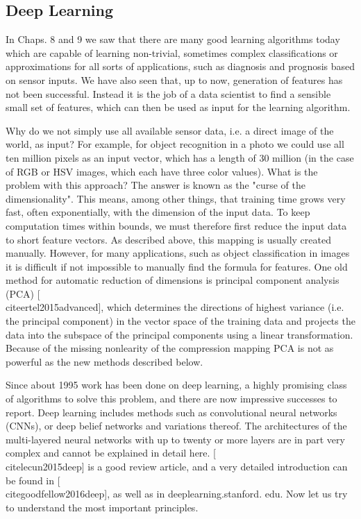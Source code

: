 \documentclass[10pt]{book}
\begin{document}
\subsection*{Deep Learning}
In Chaps. 8 and 9 we saw that there are many good learning algorithms today which are capable of learning non-trivial, sometimes complex classifications or approximations for all sorts of applications, such as diagnosis and prognosis based on sensor inputs. We have also seen that, up to now, generation of features has not been successful. Instead it is the job of a data scientist to find a sensible small set of features, which can then be used as input for the learning algorithm.

Why do we not simply use all available sensor data, i.e. a direct image of the world, as input? For example, for object recognition in a photo we could use all ten million pixels as an input vector, which has a length of 30 million (in the case of RGB or HSV images, which each have three color values). What is the problem with this approach? The answer is known as the "curse of the dimensionality". This means, among other things, that training time grows very fast, often exponentially, with the dimension of the input data. To keep computation times within bounds, we must therefore first reduce the input data to short feature vectors. As described above, this mapping is usually created manually. However, for many applications, such as object classification in images it is difficult if not impossible to manually find the formula for features. One old method for automatic reduction of dimensions is principal component analysis (PCA) [\\cite{ertel2015advanced}], which determines the directions of highest variance (i.e. the principal component) in the vector space of the training data and projects the data into the subspace of the principal components using a linear transformation. Because of the missing nonlearity of the compression mapping PCA is not as powerful as the new methods described below.

Since about 1995 work has been done on deep learning, a highly promising class of algorithms to solve this problem, and there are now impressive successes to report. Deep learning includes methods such as convolutional neural networks (CNNs), or deep belief networks and variations thereof. The architectures of the multi-layered neural networks with up to twenty or more layers are in part very complex and cannot be explained in detail here. [\\cite{lecun2015deep}] is a good review article, and a very detailed introduction can be found in [\\cite{goodfellow2016deep}], as well as in deeplearning.stanford. edu. Now let us try to understand the most important principles.
\end{document}
